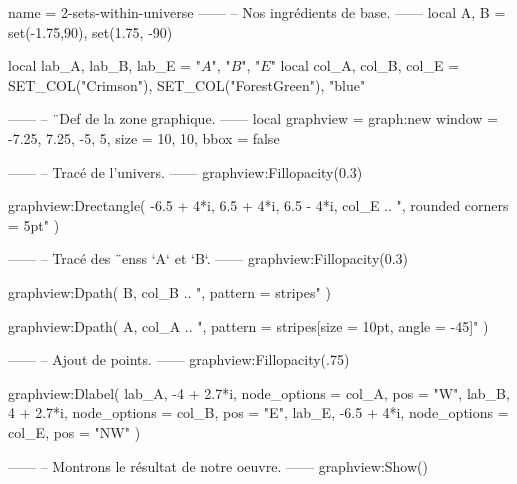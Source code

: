 \documentclass[border = 3pt]{standalone}
\begin{document}
\begin{luadraw*}{name = 2-sets-within-universe}
------
-- Nos ingrédients de base.
------
local A, B = set(-1.75,90), set(1.75, -90)

local lab_A, lab_B, lab_E = "$A$", "$B$", "$E$"
local col_A, col_B, col_E = SET_COL("Crimson"), SET_COL("ForestGreen"), "blue"

------
-- ¨Def de la zone graphique.
------
local graphview = graph:new{
  window = {-7.25, 7.25, -5, 5},
  size   = {10, 10},
  bbox   = false
}

------
-- Tracé de l'univers.
------
graphview:Fillopacity(0.3)

graphview:Drectangle(
  -6.5 + 4*i, 6.5 + 4*i, 6.5 - 4*i,
  col_E .. ", rounded corners = 5pt"
)

------
-- Tracé des ¨enss `A` et `B`.
------
graphview:Fillopacity(0.3)

graphview:Dpath(
  B,
  col_B .. ", pattern = stripes"
)

graphview:Dpath(
  A,
  col_A .. ", pattern = {stripes[size = 10pt, angle = -45]}"
)

------
-- Ajout de points.
------
graphview:Fillopacity(.75)

graphview:Dlabel(
  lab_A, -4 + 2.7*i, {node_options = col_A, pos = "W"},
  lab_B,  4 + 2.7*i, {node_options = col_B, pos = "E"},
  lab_E, -6.5 + 4*i, {node_options = col_E, pos = "NW"}
)

------
-- Montrons le résultat de notre oeuvre.
------
graphview:Show()
\end{luadraw*}
\end{document}
